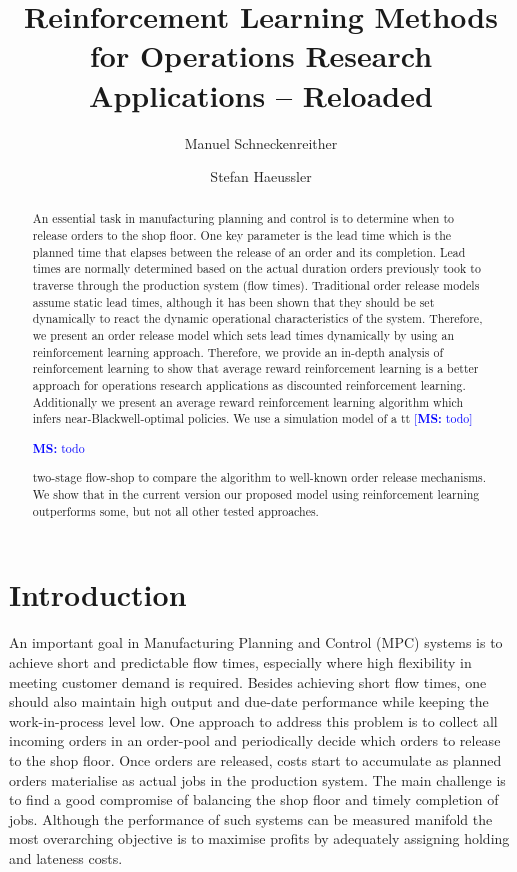 \documentclass[envcountsame]{llncs}
\title{
  Reinforcement Learning Methods for Operations Research Applications -- Reloaded
}
\author{Manuel Schneckenreither%
  \and Stefan Haeussler%
}
\institute{
  Department of Information Systems,
  Production and Logistics Management,
  University of Innsbruck, Austria\\
  email: \email{manuel.schneckenreither@uibk.ac.at,stefan.haeussler@uibk.ac.at}
}
\newcommand\MS[2][r]{\ifx t#1 \textcolor{blue}{[\textbf{MS:} #2]}
  \else \begin{center}\textcolor{blue}{\textbf{MS:} #2} \end{center} \fi}
\begin{document}
\maketitle

\begin{abstract}
  An essential task in manufacturing planning and control is to determine when to release orders to
  the shop floor. One key parameter is the lead time which is the planned time that elapses between
  the release of an order and its completion. Lead times are normally determined based on the actual
  duration orders previously took to traverse through the production system (flow times).
  Traditional order release models assume static lead times, although it has been shown that they
  should be set dynamically to react the dynamic operational characteristics of the system.
  Therefore, we present an order release model which sets lead times dynamically by using an
  reinforcement learning approach. Therefore, we provide an in-depth analysis of reinforcement
  learning to show that average reward reinforcement learning is a better approach for operations
  research applications as discounted reinforcement learning. Additionally we present an average
  reward reinforcement learning algorithm which infers near-Blackwell-optimal policies. We use a
  simulation model of a \MS[t]{todo}two-stage flow-shop to compare the algorithm
  to %
  well-known order release mechanisms. We show that in the current version our proposed model using
  reinforcement learning outperforms some, but not all other tested approaches.
\end{abstract}


\section{Introduction}\label{sec:introduction}
An important goal in Manufacturing Planning and Control (MPC) systems is to achieve short and
predictable flow times, especially where high flexibility in meeting customer demand is required.
Besides achieving short flow times, one should also maintain high output and due-date performance
while keeping the work-in-process level low. One approach to address this problem is to collect all
incoming orders in an order-pool and periodically decide which orders to release to the shop floor.
Once orders are released, costs start to accumulate as planned orders materialise as actual jobs in
the production system. The main challenge is to find a good compromise of balancing the shop floor
and timely completion of jobs. Although the performance of such systems can be measured manifold the
most overarching objective is to maximise profits by adequately assigning holding and lateness
costs.
\end{document}
